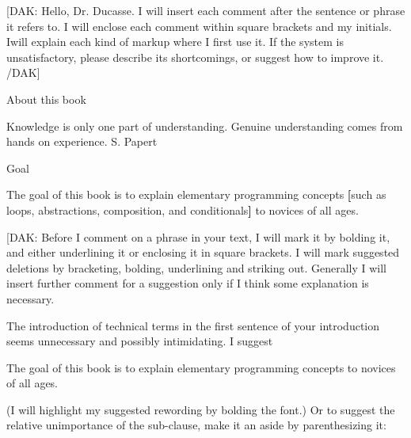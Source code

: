 \documentclass[12pt,a4paper]{article}
\begin{document}
[DAK: Hello, Dr. Ducasse.  I will insert each comment after the sentence or phrase it refers to.  I will enclose each comment within square brackets and my initials.  Iwill explain each kind of markup where I first use it.  I{f the system is unsatisfactory, p}lease describe its shortcomings, or suggest how to improve it. /DAK]





About this book 





Knowledge is only one part of understanding. Genuine understanding comes from hands on experience.  S. Papert 








Goal 





The goal of this book is to explain elementary programming concepts\textbf{ [}such as loops, abstractions, composition, and conditionals\textbf{] }to novices of all ages. 





[DAK:  Before I comment on a phrase{ in your text, I will mark it }by {bolding it, and either underlining it or }enclosing it in square brackets.  {I will mark suggested deletions by bracketing, bolding, underlining and striking out.  Generally I will insert further comment for a suggestion only if I think some explanation is necessary. }





The introduction of technical terms in the first sentence of your introduction seems unnecessary and possibly intimidating.  I suggest





The goal of this book is to explain elementary programming concepts to novices of all ages. 


\begin{flushleft}

\end{flushleft}


\begin{flushleft}
{(I will highlight my suggested rewording by bolding the font.)  Or  to suggest the relative unimportance of the sub-clause, make it an aside by parenthesizing it:}
\end{flushleft}
\end{document}
